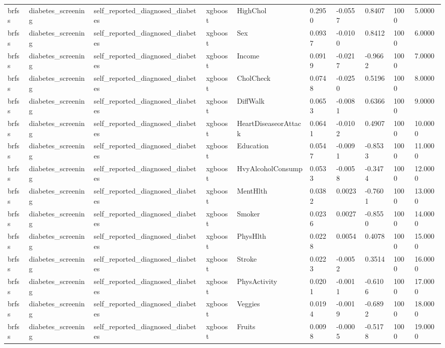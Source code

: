 \begin{tabular}{llllllllll}
brfss & diabetes\_screening & self\_reported\_diagnosed\_diabetes & xgboost & HighChol & 0.2950 & -0.0557 & 0.8407 & 1000 & 5.0000 \\
brfss & diabetes\_screening & self\_reported\_diagnosed\_diabetes & xgboost & Sex & 0.0937 & -0.0100 & 0.8412 & 1000 & 6.0000 \\
brfss & diabetes\_screening & self\_reported\_diagnosed\_diabetes & xgboost & Income & 0.0919 & -0.0217 & -0.9662 & 1000 & 7.0000 \\
brfss & diabetes\_screening & self\_reported\_diagnosed\_diabetes & xgboost & CholCheck & 0.0748 & -0.0250 & 0.5196 & 1000 & 8.0000 \\
brfss & diabetes\_screening & self\_reported\_diagnosed\_diabetes & xgboost & DiffWalk & 0.0653 & -0.0081 & 0.6366 & 1000 & 9.0000 \\
brfss & diabetes\_screening & self\_reported\_diagnosed\_diabetes & xgboost & HeartDiseaseorAttack & 0.0641 & -0.0102 & 0.4907 & 1000 & 10.0000 \\
brfss & diabetes\_screening & self\_reported\_diagnosed\_diabetes & xgboost & Education & 0.0547 & -0.0091 & -0.8533 & 1000 & 11.0000 \\
brfss & diabetes\_screening & self\_reported\_diagnosed\_diabetes & xgboost & HvyAlcoholConsump & 0.0533 & -0.0058 & -0.3474 & 1000 & 12.0000 \\
brfss & diabetes\_screening & self\_reported\_diagnosed\_diabetes & xgboost & MentHlth & 0.0382 & 0.0023 & -0.7601 & 1000 & 13.0000 \\
brfss & diabetes\_screening & self\_reported\_diagnosed\_diabetes & xgboost & Smoker & 0.0236 & 0.0027 & -0.8550 & 1000 & 14.0000 \\
brfss & diabetes\_screening & self\_reported\_diagnosed\_diabetes & xgboost & PhysHlth & 0.0228 & 0.0054 & 0.4078 & 1000 & 15.0000 \\
brfss & diabetes\_screening & self\_reported\_diagnosed\_diabetes & xgboost & Stroke & 0.0223 & -0.0052 & 0.3514 & 1000 & 16.0000 \\
brfss & diabetes\_screening & self\_reported\_diagnosed\_diabetes & xgboost & PhysActivity & 0.0201 & -0.0011 & -0.6106 & 1000 & 17.0000 \\
brfss & diabetes\_screening & self\_reported\_diagnosed\_diabetes & xgboost & Veggies & 0.0194 & -0.0019 & -0.6892 & 1000 & 18.0000 \\
brfss & diabetes\_screening & self\_reported\_diagnosed\_diabetes & xgboost & Fruits & 0.0098 & -0.0005 & -0.5178 & 1000 & 19.0000 \\

\end{tabular}
